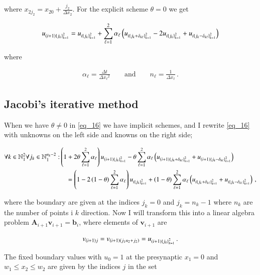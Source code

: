 \documentclass[11pt,english,a4paper]{article}
\begin{document}
\begin{flushleft}
where $x_{2 j_2} = x_{2 0}  + \frac{j_2}{\Delta x_2}$. For the explicit scheme $\theta = 0$ we get

\begin{align}
u_{(i+1)\left\lbrace{j_k}\right\rbrace_{k=1}^2} = u_{i\left\lbrace{j_k}\right\rbrace_{k=1}^2} + \sum_{\ell=1}^2 \alpha_\ell\left({u_{i\left\lbrace{j_k+\delta_{k\ell}}\right\rbrace_{k=1}^2} - 2u_{i\left\lbrace{j_k}\right\rbrace_{k=1}^2} +u_{i\left\lbrace{j_k-\delta_{k\ell}}\right\rbrace_{k=1}^2}}\right)
\label{eq_17}
\end{align}

where

\begin{align*}
\alpha_\ell = \frac{\Delta t}{\Delta {x_\ell}^2} \qquad \text{and} \qquad n_\ell = \frac{1}{\Delta x_\ell} \,.
\end{align*}

\subsection{Jacobi's iterative method}

When we have $\theta\neq 0$ in \eqref{eq_16} we have implicit schemes, and I rewrite \eqref{eq_16} with unknowns on the left side and knowns on the right side;

\begin{align*}
\forall k\in\mathbb{N}_1^2 \forall j_k \in \mathbb{N}_1^{n_k-2} : &\left({1+2\theta\sum_{\ell=1}^2 \alpha_\ell}\right) u_{(i+1)\left\lbrace{j_k}\right\rbrace_{k=1}^2} - \theta\sum_{\ell = 1}^2\alpha_\ell \left({u_{(i+1)\left\lbrace{j_k+\delta_{k\ell}}\right\rbrace_{k=1}^2} + u_{(i+1)\left\lbrace{j_k-\delta_{k\ell}}\right\rbrace_{k=1}^2}}\right) 
\\
&\quad = \left({1-2\left({1-\theta}\right)\sum_{\ell = 1}^2 \alpha_\ell}\right) u_{i\left\lbrace{j_k}\right\rbrace_{k=1}^2} + \left({1-\theta}\right)\sum_{\ell=1}^2\alpha_\ell\left({u_{i\left\lbrace{j_k+\delta_{k\ell}}\right\rbrace_{k=1}^2} + u_{i\left\lbrace{j_k-\delta_{k\ell}}\right\rbrace_{k=1}^2}}\right) \,,
\end{align*}

where the boundary are given at the indices $j_k=0$ and $j_k= n_k-1$ where $n_k$ are the number of points i $k$ direction. Now I will transform this into a linear algebra problem $\textbf{A}_{i+1}\textbf{v}_{i+1} = \textbf{b}_i$, where elements of $\textbf{v}_{i+1}$ are

\begin{align}
v_{(i+1)j} = v_{(i+1)(j_1 n_2 + j_2)} = u_{(i+1)\left\lbrace{j_k}\right\rbrace_{k=1}^2} \,.
\label{eq_18}
\end{align}

The fixed boundary values with $u_0=1$ at the presynaptic $x_1=0$ and $w_1 \leq x_2 \leq w_2$ are given by the indices $j$ in the set


\end{flushleft}
\end{document}

